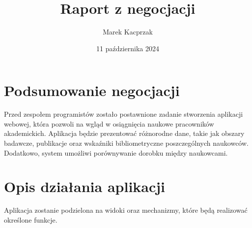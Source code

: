 \documentclass{article}
\title{Raport z negocjacji}
\author{Marek Kacprzak}
\date{11 października 2024}
\begin{document}
\maketitle

\tableofcontents

\section{Podsumowanie negocjacji}
Przed zespołem programistów zostało postawnione zadanie stworzenia aplikacji webowej, która pozwoli na wgląd w osiągnięcia naukowe pracowników akademickich. Aplikacja będzie prezentować różnorodne dane, takie jak obszary badawcze, publikacje oraz wskaźniki bibliometryczne poszczególnych naukowców.
Dodatkowo, system umożliwi porównywanie dorobku między naukowcami.

\section{Opis działania aplikacji}
Aplikacja zostanie podzielona na widoki oraz mechanizmy, które będą realizować określone funkcje.
\end{document}
